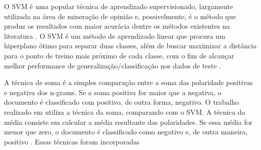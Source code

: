 \documentclass[template.tex]{subfiles}
\begin{document}
O SVM é uma popular técnica de aprendizado supervisionado, largamente utilizada na área de mineração de opinião e, possivelmente, é o método que produz os resultados com maior acurácia dentre os métodos existentes na literatura \cite{moraes2012document}. O SVM é um método de aprendizado linear que procura um hiperplano ótimo para separar duas classes, além de buscar maximizar a distância para o ponto de treino mais próximo de cada classe, com o fim de alcançar melhor performance de generalização/classificação nos dados de teste \cite{friedman2001elements}.


A técnica de soma é a simples comparação entre a soma das polaridade positivas e negativa dos n-grams. Se a soma positiva for maior que a negativa, o documento é classificado com positivo, de outra forma, negativo. O trabalho realizado em  utiliza a técnica da soma, comparando com o SVM. A técnica da média consiste em calcular a média resultante das polaridades. Se essa média for menor que zero, o documento é classificado como negativo e, de outra maneira, positivo . Essas técnicas foram incorporadas 

\end{document}
